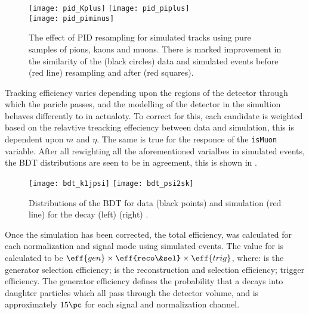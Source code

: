 \begin{figure}
  \begin{center}
    \texttt{[image: pid\_Kplus]}
    \texttt{[image: pid\_piplus]}\\
    \texttt{[image: pid\_piminus]}
    \caption[Effect of resampling PID variables in simulation]
    {\small
      The effect of PID resampling for simulated tracks using pure samples of pions, kaons and
      muons.
      There is marked improvement in the similarity of the (black circles) \btojpsikpipi data and
      simulated events before (red line) resampling and after (red squares).
    }
    \label{fig:hhh:pid}
  \end{center}
\end{figure}


Tracking efficiency varies depending upon the regions of the detector through which the paricle
passes, and the modelling of the detector in the simultion behaves differently to in actualoty.
To correct for this, each candidate is weighted based on the relavtive treacking effeciency between
data and simulation, this is dependent upon $m$ and $\eta$.
The same is true for the responce of the {\tt isMuon} variable.
After all rewighting all the aforementioned varialbes in simulated events, the BDT distributions
are seen to be in agreement, this is shown in .

\begin{figure}
  \begin{center}
    \texttt{[image: bdt\_k1jpsi]}
    \texttt{[image: bdt\_psi2sk]}
    \caption[BDT distributions in data and simulation]
    {\small
      Distributions of the BDT for data (black points) and simulation (red line) for the decay
      (left) 
      (right) \btopsitwosk.
    }
    \label{fig:kpipi:bdt}
  \end{center}
\end{figure}

Once the simulation has been corrected, the total efficiency,  was calculated for each
normalization and signal mode using simulated events.
The value for  is calculated to be $\eff{gen}\times\eff{reco\&sel}\times\eff{trig}$, where:
 is the generator selection efficiency;
 is the reconstruction and selection efficiency;
 trigger efficiency.
The generator efficiency defines the probability that a \Bp decays into daughter particles which
all pass through the \lhcb detector volume, and is approximately $15\pc$ for each signal and
normalization channel.

